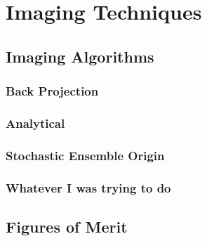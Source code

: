 
\chapter{Imaging Techniques}\label{ch:techniques}

\section{Imaging Algorithms}

\subsection{Back Projection}\label{ssec:backprojection}

\subsection{Analytical}\label{ssec:analytical}

\subsection{Stochastic Ensemble Origin}\label{ssec:soe}

\subsection{Whatever I was trying to do}

\section{Figures of Merit}\label{sec:fom}

